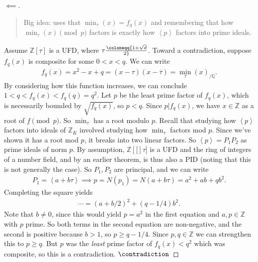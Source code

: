 \begin{proof}[$\impliedby$]

\begin{quote}
Big idea: uses that \(\min_\tau(x) = f_q(x)\) and remembering that how
\(\min_\tau(x) \pmod p\) factors is exactly how
\(\left\langle{ p }\right\rangle\) factors into prime ideals.
\end{quote}

Assume \(\mathbb{Z}\left[ { \tau } \right]\) is a UFD, where
\(\tau\coloneqq{1 + \sqrt{d} \over 2 }\). Toward a contradiction,
suppose \(f_q(x)\) is composite for some \(0<x<q\). We can write
\begin{align*}
f_q(x) = x^2 - x + q = (x - \tau)( x - {\overline{{ \tau}}} ) = \min_{ \tau}(x)_{/{\mathbb{Q}}}
.\end{align*}
By considering how this function increases, we can conclude
\(1<q<f_q(x) < f_q(q) = q^2\). Let \(p\) be the least prime factor of
\(f_q(x)\), which is necessarily bounded by \(\sqrt{ f_q(x) }\), so
\(p<q\). Since \(p\mathrel{\Big|}f_q(x)\), we have \(x\in {\mathbb{Z}}\)
as a root of \(f\pmod p\). So \(\min_\tau\) has a root modulo \(p\).
Recall that studying how \(\left\langle{ p }\right\rangle\) factors into
ideals of \({\mathbb{Z}}_K\) involved studying how \(\min_\tau\) factors
mod \(p\). Since we've shown it has a root mod \(p\), it breaks into two
linear factors. So \(\left\langle{ p }\right\rangle = P_1 P_2\) as prime
ideals of norm \(p\). By assumption,
\(\mathbb{Z}\left[ {[} \right]\tau]\) is a UFD and the ring of integers
of a number field, and by an earlier theorem, is thus also a PID (noting
that this is not generally the case). So \(P_1, P_2\) are principal, and
we can write
\begin{align*}
P_1 = \left\langle{ a + b \tau }\right\rangle\implies p = N(p_1) = N( a + b \tau) = a^2 + ab + qb^2
.\end{align*}
Completing the square yields
\begin{align*}
\cdots = (a + b/2)^2 + (q-1/4)b^2
.\end{align*}
Note that \(b\neq 0\), since this would yield \(p = a^2\) in the first
equation and \(a, p \in {\mathbb{Z}}\) with \(p\) prime. So both terms
in the second equation are non-negative, and the second is positive
because \(b>1\), so \(p \geq q- 1/4\). Since \(p, q\in {\mathbb{Z}}\) we
can strengthen this to \(p \geq q\). But \(p\) was the \emph{least}
prime factor of \(f_q(x) < q^2\) which was composite, so this is a
contradiction. \(\contradiction\)

\end{proof}


